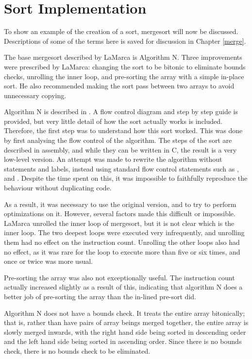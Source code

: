 
\section{Sort Implementation}

To show an example of the creation of a sort, mergesort will now be discussed.
Descriptions of some of the terms here is saved for discussion in Chapter
\ref{merge}.

The base mergesort described by LaMarca is Algorithm N. Three improvements
were prescribed by LaMarca: changing the sort to be bitonic to eliminate bounds
checks, unrolling the inner loop, and pre-sorting the array with a simple in-place
sort. He also recommended making the sort pass between two arrays to avoid
unnecessary copying.

Algorithm N is described in \cite{Knuth98}. A flow control diagram and step by
step guide is provided, but very little detail of how the sort actually works is
included. Therefore, the first step was to understand how this sort worked. This
was done by first analysing the flow control of the algorithm. The steps of the
sort are described in assembly, and while they can be written in C, the result
is a very low-level version. An attempt was made to rewrite the algorithm
without  statements and labels, instead using standard flow control
statements such as ,  and . Despite the time spent
on this, it was impossible to faithfully reproduce the behaviour without
duplicating code.

As a result, it was necessary to use the original version, and to try to perform
optimizations on it. However, several factors made this difficult or impossible.
LaMarca unrolled the inner loop of mergesort, but it is not clear which is the
inner loop. The two deepest loops were executed very infrequently, and
unrolling them had no effect on the instruction count. Unrolling the other loops
also had no effect, as it was rare for the loop to execute more than five or six
times, and once or twice was more usual.

Pre-sorting the array was also not exceptionally useful. The instruction count
actually increased slightly as a result of this, indicating that algorithm N
does a better job of pre-sorting the array than the in-lined pre-sort did.

Algorithm N does not have a bounds check. It treats the entire array
bitonically; that is, rather than have pairs of array beings merged together,
the entire array is slowly merged inwards, with the right hand side being sorted
in descending order and the left hand side being sorted in ascending order.
Since there is no bounds check, there is no bounds check to be eliminated.

